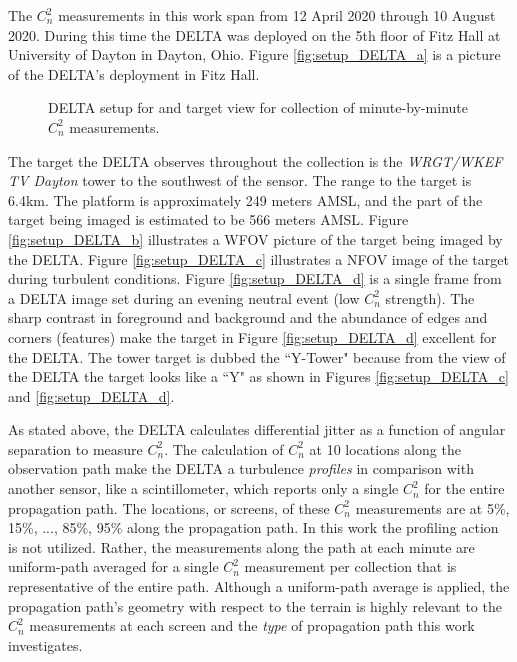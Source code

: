 The $C_{n}^{2}$ measurements in this work span from 12 April 2020 through 10 August 2020. During this time the \ac{DELTA} was deployed on the 5th floor of Fitz Hall at University of Dayton in Dayton, Ohio. Figure \ref{fig:setup_DELTA_a} is a picture of the \ac{DELTA}'s deployment in Fitz Hall.
\begin{figure}[p!]
	\centering
	\hfill
	\hfill
	\caption{DELTA setup for and target view for collection of minute-by-minute $C_{n}^{2}$ measurements.}
	\label{fig:setup_DELTA}
\end{figure}
The target the \ac{DELTA} observes throughout the collection is the \textit{WRGT/WKEF TV Dayton} tower to the southwest of the sensor. The range to the target is 6.4km. The platform is approximately 249 meters \ac{AMSL}, and the part of the target being imaged is estimated to be 566 meters \ac{AMSL}. Figure \ref{fig:setup_DELTA_b} illustrates a \ac{WFOV} picture of the target being imaged by the \ac{DELTA}. Figure \ref{fig:setup_DELTA_c} illustrates a \ac{NFOV} image of the target during  turbulent conditions. Figure \ref{fig:setup_DELTA_d} is a single frame from a \ac{DELTA} image set during an evening neutral event (low $C_{n}^{2}$ strength). The sharp contrast in foreground and background and the abundance of edges and corners (features) make the target in Figure \ref{fig:setup_DELTA_d} excellent for the \ac{DELTA}. The tower target is dubbed the ``Y-Tower" because from the view of the \ac{DELTA} the target looks like a ``Y" as shown in Figures \ref{fig:setup_DELTA_c} and \ref{fig:setup_DELTA_d}.

As stated above, the \ac{DELTA} calculates differential jitter as a function of angular separation to measure $C_{n}^{2}$. The calculation of $C_{n}^{2}$ at 10 locations along the observation path make the \ac{DELTA} a turbulence \emph{profiles} in comparison with another sensor, like a scintillometer, which reports only a single $C_{n}^{2}$ for the entire propagation path. The locations, or screens, of these $C_{n}^{2}$ measurements are at 5\%, 15\%, ..., 85\%, 95\% along the propagation path. In this work the profiling action is not utilized. Rather, the measurements along the path at each minute are uniform-path averaged for a single $C_{n}^{2}$ measurement per collection that is representative of the entire path. Although a uniform-path average is applied, the propagation path's geometry with respect to the terrain is highly relevant to the $C_{n}^{2}$ measurements at each screen and the \emph{type} of propagation path this work investigates.

